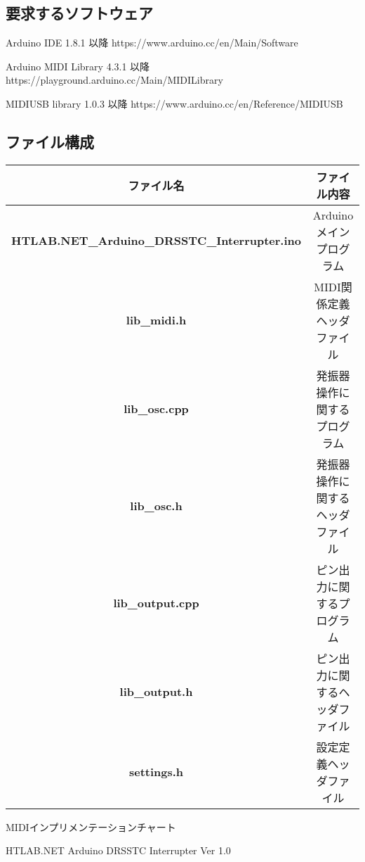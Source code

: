 \documentclass[a4paper,11pt]{jsarticle}
\newcommand{\showVer}{Ver 1.0}
\begin{document}
\subsection{要求するソフトウェア}
Arduino IDE 1.8.1 以降
https://www.arduino.cc/en/Main/Software

Arduino MIDI Library 4.3.1 以降
https://playground.arduino.cc/Main/MIDILibrary

MIDIUSB library 1.0.3 以降
https://www.arduino.cc/en/Reference/MIDIUSB



\subsection{ファイル構成}

\begin{table}[htbp]
\begin{center}
\begin{tabular}{ | c | c | }
\hline
\textbf{ファイル名} & \textbf{ファイル内容} \\\hline
\textbf{HTLAB.NET\_Arduino\_DRSSTC\_Interrupter.ino} & Arduinoメインプログラム \\\hline
\textbf{lib\_midi.h} & MIDI関係定義ヘッダファイル \\\hline
\textbf{lib\_osc.cpp} & 発振器操作に関するプログラム \\\hline
\textbf{lib\_osc.h} & 発振器操作に関するヘッダファイル \\\hline
\textbf{lib\_output.cpp} & ピン出力に関するプログラム \\\hline
\textbf{lib\_output.h} & ピン出力に関するヘッダファイル \\\hline
\textbf{settings.h} & 設定定義ヘッダファイル \\\hline
\end{tabular}
\end{center}
\end{table}





\clearpage
{}

\begin{center}
\huge{MIDIインプリメンテーションチャート}
\end{center}

\begin{flushright}
\small{HTLAB.NET Arduino DRSSTC Interrupter \showVer}
\end{flushright}
\end{document}
